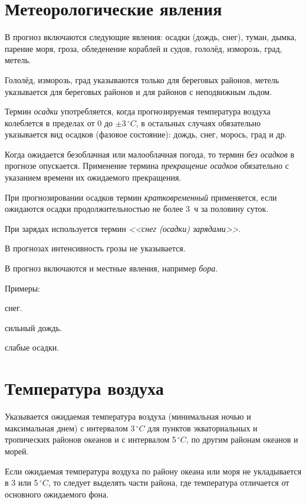 \documentclass[a4paper, 12pt, twoside, final, book, russian, fittopage, cyremdash, openright]{ncc}
\newcommand{\grC}{\ensuremath{\,^\circ{}C}\xspace}
\begin{document}
\section{Метеорологические явления}
\label{sec:meteo_phenom}

В прогноз включаются следующие явления: осадки (дождь, снег), туман,
дымка, парение моря, гроза, обледенение кораблей и судов, гололёд,
изморозь, град, метель.

Гололёд, изморозь, град указываются только для береговых районов,
метель указывается для береговых районов и для районов с неподвижным
льдом.

Термин \textit{осадки} употребляется, когда прогнозируемая температура
воздуха колеблется в пределах от 0 до $\pm3\grC$, в остальных случаях
обязательно указывается вид осадков (фазовое состояние): дождь, снег,
морось, град и др.

Когда ожидается безоблачная или малооблачная погода, то термин
\textit{без осадков} в прогнозе опускается. Применение термина
\textit{прекращение осадков} обязательно с указанием времени их
ожидаемого прекращения.

При прогнозировании осадков термин \textit{кратковременный}
применяется, если ожидаются осадки продолжительностью не более 3~ч за
половину суток.

При зарядах используется термин \textit{<<снег (осадки) зарядами>>}.

В прогнозах интенсивность грозы не указывается.

В прогноз включаются и местные явления, например \textit{бора}.

Примеры:
\begin{list}{}{}
\item {} снег.
\item {} сильный дождь.
\item {} слабые осадки.
\end{list}

\section{Температура воздуха}
\label{sec:temp}

Указывается ожидаемая температура воздуха (минимальная ночью и
максимальная днем) с интервалом 3\grC для пунктов экваториальных и
тропических районов океанов и с интервалом 5\grC, по другим районам
океанов и морей.

Если ожидаемая температура воздуха по району океана или моря не
укладывается в 3 или 5\grC, то следует выделять части района, где
температура отличается от основного ожидаемого фона.
\end{document}

